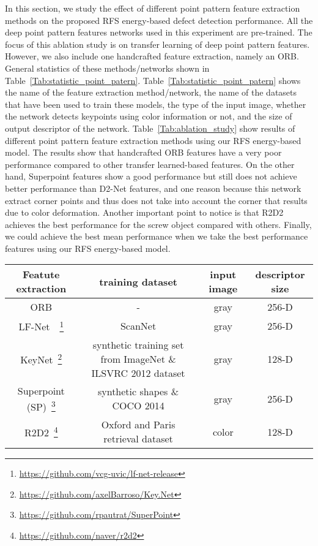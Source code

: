 \documentclass[journal]{IEEEtran}
\let\MYoriglatexcaption\caption
\renewcommand{\caption}[2][\relax]{\MYoriglatexcaption[#2]{#2}}
\begin{document}
In this section, we study the effect of different point pattern feature extraction methods on  the proposed RFS energy-based defect detection performance. All the deep point pattern features networks used in this experiment are pre-trained. The focus of this ablation study is on transfer learning of deep point pattern features. However, we also include one handcrafted feature extraction, namely an ORB\cite{rublee2011orb}.  General statistics of these methods/networks shown in Table~\ref{Tab:statistic_point_patern}. Table~\ref{Tab:statistic_point_patern} shows the name of the feature extraction method/network, the name of the datasets that have been used to train these models, the type of the input image, whether the network detects keypoints using color information or not, and the size of output descriptor of the network. Table~\ref{Tab:ablation_study} show results of different point pattern feature extraction methods using our RFS energy-based model. The results show that handcrafted ORB features have a very poor performance compared to other transfer learned-based features.
On the other hand, Superpoint features show a good performance but still does not achieve better performance than D2-Net features, and one reason because this network extract corner points and thus does not take into account the corner that results  due to color deformation. Another important point to notice is that R2D2 achieves the best performance for the screw object compared with others. Finally, we could achieve the best mean performance when we take the best performance features using our RFS energy-based model. 

\begin{table*}[!h]
\caption{General statistics of point pattern feature extraction methods used in the ablation study.}
\centering
\begin{tabular}{cccc}
	    \toprule
	Featute extraction &training dataset& input image& descriptor size\\
	\hline
	ORB&-& gray&256-D\\
	LF-Net~\cite{ono2018lf}~\footnote{\url{https://github.com/vcg-uvic/lf-net-release}}& ScanNet& gray& 256-D\\
	KeyNet~\footnote{\url{https://github.com/axelBarroso/Key.Net}}&synthetic training set from ImageNet \& 
	ILSVRC 2012 dataset&gray& 128-D\\
	Superpoint (SP)~\footnote{\url{https://github.com/rpautrat/SuperPoint}}&synthetic shapes \& COCO 2014& gray&256-D \\
	R2D2~\footnote{\url{https://github.com/naver/r2d2}}& Oxford and Paris retrieval dataset&color& 128-D\\
	    \toprule
\end{tabular}
\label{Tab:statistic_point_patern}
\end{table*}
\end{document}
